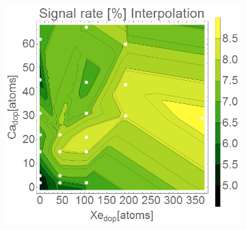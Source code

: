 \begin{figure}[h!]
\centering
\begin{subfigure}[l]{0.5\textwidth}\caption{}
\includegraphics[width=1\textwidth]{../Images/results/MIR_He_XeCaDop/interpolationSignalRate2.png} 
\end{subfigure}\hfill



\end{figure}
